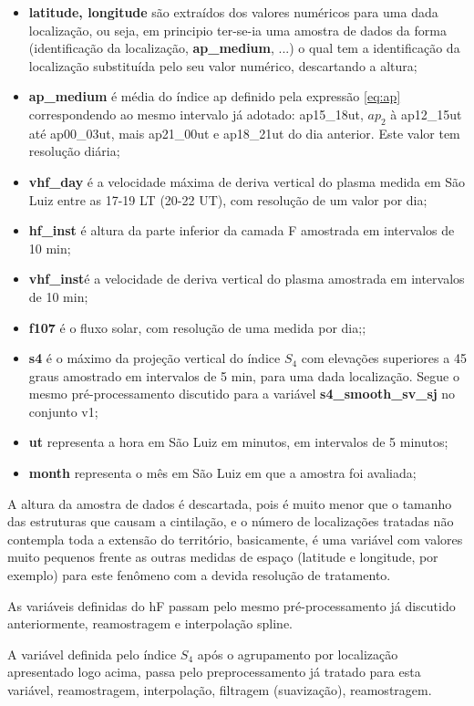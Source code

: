 \begin{itemize}
\item {\bf latitude, longitude} são extraídos dos valores numéricos para uma dada localização, ou seja, em principio ter-se-ia uma amostra de dados da forma (identificação da localização, {\bf ap\_medium}, ...) o qual tem a identificação da localização substituída pelo seu valor numérico, descartando a altura;
\item {\bf ap\_medium} é  média do índice ap definido pela expressão \ref{eq:ap} correspondendo ao mesmo intervalo já adotado: ap15\_18ut, $ap_2$ à ap12\_15ut até ap00\_03ut, mais ap21\_00ut e ap18\_21ut do dia anterior. Este valor tem resolução diária;
\item {\bf vhf\_day} é a velocidade máxima de deriva vertical do plasma medida em São Luiz entre as 17-19 LT (20-22 UT), com resolução de um valor por dia;
\item {\bf hf\_inst} é altura da parte inferior da camada F amostrada em intervalos de 10 min;
\item {\bf vhf\_inst}é a velocidade de deriva vertical do plasma amostrada em intervalos de 10 min;
\item {\bf f107}  é o fluxo solar, com resolução de uma medida por dia;;
\item {\bf s4} é o máximo da projeção vertical do índice $S_4$ com elevações superiores a 45 graus amostrado em intervalos de 5 min, para uma dada localização. Segue o mesmo pré-processamento discutido para a variável {\bf s4\_smooth\_sv\_sj} no conjunto v1;
\item {\bf ut} representa a hora em São Luiz em minutos, em intervalos de 5 minutos;
\item {\bf month} representa o mês em São Luiz em que a amostra foi avaliada;
\end{itemize}

A altura da amostra de dados é descartada, pois é muito menor que o tamanho das estruturas que causam a cintilação, e o número de localizações tratadas não contempla toda a extensão do território, basicamente, é uma variável com valores muito pequenos frente as outras medidas de espaço (latitude e longitude, por exemplo) para este fenômeno com a devida resolução de tratamento.

As variáveis definidas do hF passam pelo mesmo pré-processamento já discutido anteriormente, reamostragem e interpolação spline.

A variável definida pelo índice $S_4$ após o agrupamento por localização apresentado logo acima, passa pelo preprocessamento já tratado para esta variável, reamostragem, interpolação, filtragem (suavização), reamostragem.

